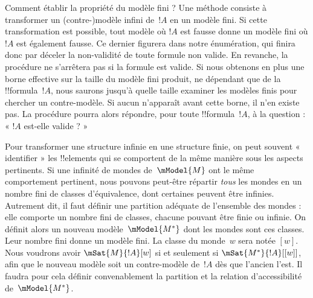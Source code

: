 \documentclass[../../../include/open-logic-section]{subfiles}
\begin{document}
Comment établir la propriété du modèle fini ? Une méthode consiste à
transformer un (contre-)modèle infini de~$!A$ en un modèle fini. Si
cette transformation est possible, tout modèle où $!A$ est fausse
donne un modèle fini où $!A$ est également fausse. Ce dernier
figurera dans notre énumération, qui finira donc par déceler la
non-validité de toute formule non valide. En revanche, la procédure ne
s'arrêtera pas si la formule est valide. Si nous obtenons en plus une
borne effective sur la taille du modèle fini produit, ne dépendant
que de la !!{formula}~$!A$, nous saurons jusqu'à quelle taille
examiner les modèles finis pour chercher un contre-modèle. Si aucun
n'apparaît avant cette borne, il n'en existe pas. La procédure pourra
alors répondre, pour toute !!{formula}~$!A$, à la question : « $!A$ est-elle valide ? »

Pour transformer une structure infinie en une structure finie, on
peut souvent « identifier » les !!{element}s qui se comportent de la
même manière sous les aspects pertinents. Si une infinité de mondes
de~$\mModel{M}$ ont le même comportement pertinent, nous pouvons
peut-être répartir \emph{tous} les mondes en un nombre fini de classes
d'équivalence, dont certaines peuvent être infinies. Autrement dit,
il faut définir une partition adéquate de l'ensemble des mondes :
elle comporte un nombre fini de classes, chacune pouvant être finie
ou infinie. On définit alors un nouveau modèle~$\mModel{M^*}$ dont
les mondes sont ces classes. Leur nombre fini donne un modèle fini.
La classe du monde~$w$ sera notée $[w]$. Nous voudrons avoir
$\mSat{M}{!A}[w]$ si et seulement si
$\mSat{M^*}{!A}[{[w]}]$, afin que le nouveau modèle soit un
contre-modèle de~$!A$ dès que l'ancien l'est. Il faudra pour cela
définir convenablement la partition et la relation d'accessibilité
de~$\mModel{M^*}$.
\end{document}
